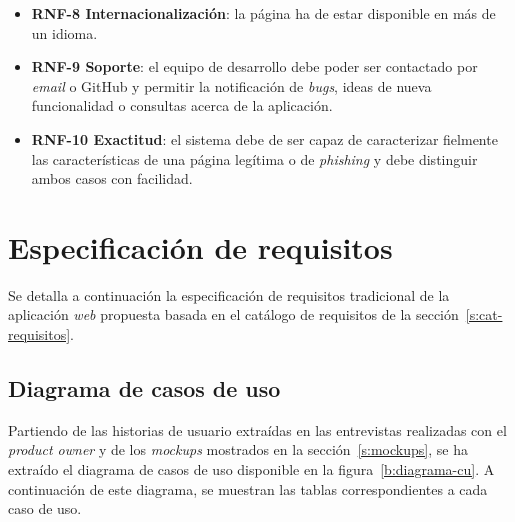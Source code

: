 \begin{itemize}
	\item \textbf{RNF-8 Internacionalización}: la página ha de estar disponible en más de un idioma.
	\item \textbf{RNF-9 Soporte}: el equipo de desarrollo debe poder ser contactado por \textit{email} o GitHub y permitir la notificación de \textit{bugs}, ideas de nueva funcionalidad o consultas acerca de la aplicación.
	\item \textbf{RNF-10 Exactitud}: el sistema debe de ser capaz de caracterizar fielmente las características de una página legítima o de \textit{phishing} y debe distinguir ambos casos con facilidad.
\end{itemize}

\section{Especificación de requisitos}
\label{s:requisitos}

Se detalla a continuación la especificación de requisitos tradicional de la aplicación \textit{web} propuesta basada en el catálogo de requisitos de la sección~\ref{s:cat-requisitos}.

\subsection{Diagrama de casos de uso}
\label{ss:diagrama-casos-uso}

Partiendo de las historias de usuario extraídas en las entrevistas realizadas con el \textit{product owner} y de los \textit{mockups} mostrados en la sección~\ref{s:mockups}, se ha extraído el diagrama de casos de uso disponible en la figura~\ref{b:diagrama-cu}. A continuación de este diagrama, se muestran las tablas correspondientes a cada caso de uso.

